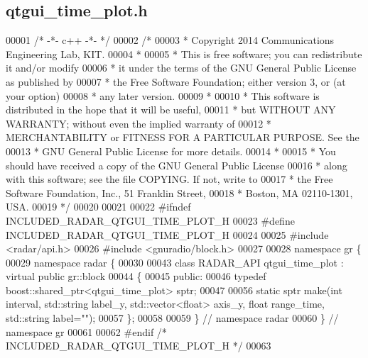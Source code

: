\subsection{qtgui\+\_\+time\+\_\+plot.\+h}
\label{qtgui__time__plot_8h_source}

\begin{DoxyCode}
00001 \textcolor{comment}{/* -*- c++ -*- */}
00002 \textcolor{comment}{/* }
00003 \textcolor{comment}{ * Copyright 2014 Communications Engineering Lab, KIT.}
00004 \textcolor{comment}{ * }
00005 \textcolor{comment}{ * This is free software; you can redistribute it and/or modify}
00006 \textcolor{comment}{ * it under the terms of the GNU General Public License as published by}
00007 \textcolor{comment}{ * the Free Software Foundation; either version 3, or (at your option)}
00008 \textcolor{comment}{ * any later version.}
00009 \textcolor{comment}{ * }
00010 \textcolor{comment}{ * This software is distributed in the hope that it will be useful,}
00011 \textcolor{comment}{ * but WITHOUT ANY WARRANTY; without even the implied warranty of}
00012 \textcolor{comment}{ * MERCHANTABILITY or FITNESS FOR A PARTICULAR PURPOSE.  See the}
00013 \textcolor{comment}{ * GNU General Public License for more details.}
00014 \textcolor{comment}{ * }
00015 \textcolor{comment}{ * You should have received a copy of the GNU General Public License}
00016 \textcolor{comment}{ * along with this software; see the file COPYING.  If not, write to}
00017 \textcolor{comment}{ * the Free Software Foundation, Inc., 51 Franklin Street,}
00018 \textcolor{comment}{ * Boston, MA 02110-1301, USA.}
00019 \textcolor{comment}{ */}
00020 
00021 
00022 \textcolor{preprocessor}{#ifndef INCLUDED\_RADAR\_QTGUI\_TIME\_PLOT\_H}
00023 \textcolor{preprocessor}{#define INCLUDED\_RADAR\_QTGUI\_TIME\_PLOT\_H}
00024 
00025 \textcolor{preprocessor}{#include <radar/api.h>}
00026 \textcolor{preprocessor}{#include <gnuradio/block.h>}
00027 
00028 \textcolor{keyword}{namespace }gr \{
00029   \textcolor{keyword}{namespace }radar \{
00030 
00043     \textcolor{keyword}{class }RADAR_API qtgui_time_plot : \textcolor{keyword}{virtual} \textcolor{keyword}{public} gr::block
00044     \{
00045      \textcolor{keyword}{public}:
00046       \textcolor{keyword}{typedef} boost::shared\_ptr<qtgui\_time\_plot> sptr;
00047 
00056       \textcolor{keyword}{static} sptr make(\textcolor{keywordtype}{int} interval, std::string label\_y, std::vector<float> axis\_y, \textcolor{keywordtype}{float} range\_time, 
      std::string label=\textcolor{stringliteral}{""});
00057     \};
00058 
00059   \} \textcolor{comment}{// namespace radar}
00060 \} \textcolor{comment}{// namespace gr}
00061 
00062 \textcolor{preprocessor}{#endif }\textcolor{comment}{/* INCLUDED\_RADAR\_QTGUI\_TIME\_PLOT\_H */}\textcolor{preprocessor}{}
00063 
\end{DoxyCode}
